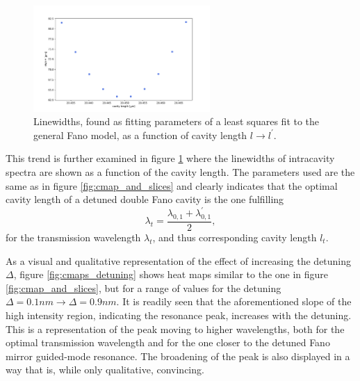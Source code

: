 \begin{figure}[h!]
    \centering
    \includegraphics[width=0.6\textwidth]{figures/cmap_lw_vs_l_intracavity.pdf}
    \caption{Linewidths, found as fitting parameters of a least squares fit to the general Fano model, as a function of cavity length $l \rightarrow l^{\prime}$.}
    \label{fig:lw_vs_l_scan}
\end{figure}

This trend is further examined in figure \ref{fig:lw_vs_l_scan} where the linewidths of intracavity spectra are shown as a function of the cavity length. The parameters used are the same as in figure \ref{fig:cmap_and_slices} and clearly indicates that the optimal cavity length of a detuned double Fano cavity is the one fulfilling 
\begin{equation}
    \lambda_t = \frac{\lambda_{0,1} + \lambda_{0,1}^{\prime}}{2},
\end{equation}
for the transmission wavelength $\lambda_t$, and thus corresponding cavity length $l_t$.

As a visual and qualitative representation of the effect of increasing the detuning $\Delta$, figure \ref{fig:cmaps_detuning} shows heat maps similar to the one in figure \ref{fig:cmap_and_slices}, but for a range of values for the detuning $\Delta=0.1nm \rightarrow \Delta=0.9nm$. It is readily seen that the aforementioned slope of the high intensity region, indicating the resonance peak, increases with the detuning. This is a representation of the peak moving to higher wavelengths, both for the optimal transmission wavelength and for the one closer to the detuned Fano mirror guided-mode resonance. The broadening of the peak is also displayed in a way that is, while only qualitative, convincing. 


